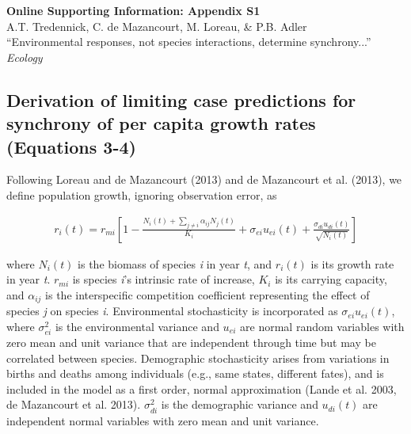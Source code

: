 \documentclass[12pt,]{article}
\title{}
\author{}
\date{}
\begin{document}
\maketitle


\renewcommand\linenumberfont{\normalfont\tiny\sffamily\color{gray}}




\begin{center}
\textbf{\Large{Online Supporting Information: Appendix S1}} \\
A.T. Tredennick, C. de Mazancourt, M. Loreau, \& P.B. Adler \\
``Environmental responses, not species interactions, determine synchrony...'' \\
\emph{Ecology}
\end{center}

\renewcommand{\theequation}{S\arabic{equation}}
\renewcommand{\thetable}{S\arabic{table}}
\renewcommand{\thefigure}{S\arabic{figure}}

\tableofcontents
\listoffigures
\listoftables
\newpage{}

\subsection{Derivation of limiting case predictions for synchrony of per
capita growth rates (Equations
3-4)}\label{derivation-of-limiting-case-predictions-for-synchrony-of-per-capita-growth-rates-equations-3-4}

Following Loreau and {{de Mazancourt}} (2013) and {{de Mazancourt}} et
al. (2013), we define population growth, ignoring observation error, as

\begin{align}
r_i(t) = r_{mi} \left[ 1- \frac{N_i(t)+\sum_{j \neq i} \alpha_{ij}N_j(t)} {K_i} + \sigma_{ei}u_{ei}(t) + \frac{\sigma_{di}u_{di}(t)}{\sqrt{N_i(t)}} \right]
\end{align}

\noindent where \(N_i(t)\) is the biomass of species \emph{i} in year
\emph{t}, and \(r_i(t)\) is its growth rate in year \emph{t}. \(r_{mi}\)
is species \emph{i}'s intrinsic rate of increase, \(K_i\) is its
carrying capacity, and \(\alpha_{ij}\) is the interspecific competition
coefficient representing the effect of species \emph{j} on species
\emph{i}. Environmental stochasticity is incorporated as
\(\sigma_{ei}u_{ei}(t)\), where \(\sigma_{ei}^2\) is the environmental
variance and \(u_{ei}\) are normal random variables with zero mean and
unit variance that are independent through time but may be correlated
between species. Demographic stochasticity arises from variations in
births and deaths among individuals (e.g., same states, different
fates), and is included in the model as a first order, normal
approximation (Lande et al. 2003, {{de Mazancourt}} et al. 2013).
\(\sigma_{di}^2\) is the demographic variance and \(u_{di}(t)\) are
independent normal variables with zero mean and unit variance.
\end{document}
